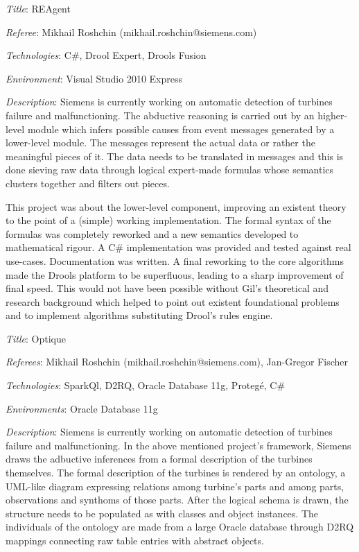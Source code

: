 \documentclass[letterpaper]{article}
\renewenvironment{itemize}{
  \begin{list}{}{
    \setlength{\leftmargin}{1.5em}
  }
}{
  \end{list}
}
\newenvironment{itemize1}{
  \begin{list}{}{
    \setlength{\leftmargin}{0em}
  }
}{
  \end{list}
}
\begin{document}
\begin{itemize1}
\bigskip
\item
\begin{itemize}
\item {\it Title}: REAgent
\item {\it Referee}: Mikhail Roshchin (mikhail.roshchin@siemens.com)
\item {\it Technologies}: C\#, Drool Expert, Drools Fusion
\item {\it Environment}: Visual Studio 2010 Express
\item {\it Description}: Siemens is currently working on automatic detection of turbines failure and malfunctioning. The abductive reasoning is carried out by an higher-level module which infers possible causes from event messages generated by a lower-level module. The messages represent the actual data or rather the meaningful pieces of it. The data needs to be translated in messages and this is done sieving raw data through logical expert-made formulas whose semantics clusters together and filters out pieces. 
\medskip

This project was about the lower-level component, improving an existent theory to the point of a (simple) working implementation. The formal syntax of the formulas was completely reworked and a new semantics developed to mathematical rigour. A C\# implementation was provided and tested against real use-cases. Documentation was written. A final reworking to the core algorithms made the Drools platform to be superfluous, leading to a sharp improvement of final speed. This would not have been possible without Gil's theoretical and research background which helped to  point out existent foundational problems and to implement algorithms substituting Drool's rules engine.
\end{itemize}

\bigskip
\item
\begin{itemize}
\item {\it Title}: Optique
\item {\it Referees}: Mikhail Roshchin (mikhail.roshchin@siemens.com), Jan-Gregor Fischer
\item {\it Technologies}: SparkQl, D2RQ, Oracle Database 11g, Proteg\'e, C\# 
\item {\it Environments}: Oracle Database 11g
\item {\it Description}: Siemens is currently working on automatic detection of turbines failure and malfunctioning. 
In the above mentioned project's framework, Siemens draws the adbuctive inferences from a formal description of the turbines themselves. The formal description of the turbines is rendered by an ontology, a UML-like diagram expressing relations among turbine's parts and among parts, observations and synthoms of those parts. After the logical schema is drawn, the structure needs to be populated as with classes and object instances. The individuals of the ontology are made from a large Oracle database through D2RQ mappings connecting raw table entries with abstract objects. 
\medskip


\end{itemize}
\end{itemize1}
\end{document}
